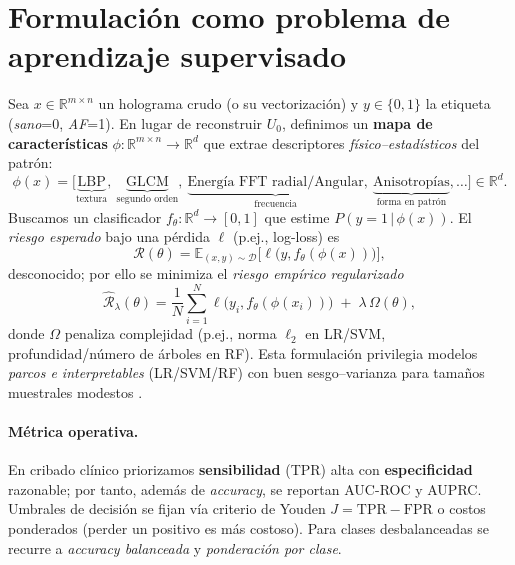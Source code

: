 \section{Formulación como problema de aprendizaje supervisado}
Sea $x\in \mathbb{R}^{m\times n}$ un holograma crudo (o su vectorización) y $y\in\{0,1\}$ la etiqueta (\emph{sano}=0, \emph{AF}=1). En lugar de reconstruir $U_0$, definimos un \textbf{mapa de características} $\phi:\mathbb{R}^{m\times n}\to\mathbb{R}^d$ que extrae descriptores \emph{físico–estadísticos} del patrón:
\[
\phi(x) = \big[\underbrace{\text{LBP}}_{\text{textura}},\ 
\underbrace{\text{GLCM}}_{\text{segundo orden}},\ 
\underbrace{\text{Energía FFT radial/Angular}}_{\text{frecuencia}},\ 
\underbrace{\text{Anisotropías}}_{\text{forma en patrón}},\ldots\big] \in \mathbb{R}^d.
\]
Buscamos un clasificador $f_\theta:\mathbb{R}^d\to [0,1]$ que estime $P(y{=}1\,|\,\phi(x))$. El \emph{riesgo esperado} bajo una pérdida $\ell$ (p.ej., log-loss) es
\begin{equation}
\mathcal{R}(\theta) = \mathbb{E}_{(x,y)\sim \mathcal{D}} \big[\ell\big(y, f_\theta(\phi(x))\big)\big],
\end{equation}
desconocido; por ello se minimiza el \emph{riesgo empírico regularizado}
\begin{equation}
\hat{\mathcal{R}}_\lambda(\theta) = \frac{1}{N}\sum_{i=1}^N \ell\big(y_i, f_\theta(\phi(x_i))\big) \;+\; \lambda\,\Omega(\theta),
\end{equation}
donde $\Omega$ penaliza complejidad (p.ej., norma $\ell_2$ en LR/SVM, profundidad/número de árboles en RF). Esta formulación privilegia modelos \emph{parcos e interpretables} (LR/SVM/RF) con buen sesgo–varianza para tamaños muestrales modestos \cite{Tsamardinos2022Patterns}.

\paragraph{Métrica operativa.} En cribado clínico priorizamos \textbf{sensibilidad} (TPR) alta con \textbf{especificidad} razonable; por tanto, además de \emph{accuracy}, se reportan AUC-ROC y AUPRC. Umbrales de decisión se fijan vía criterio de Youden $J=\text{TPR}-\text{FPR}$ o costos ponderados (perder un positivo es más costoso). Para clases desbalanceadas se recurre a \emph{accuracy balanceada} y \emph{ponderación por clase}.

